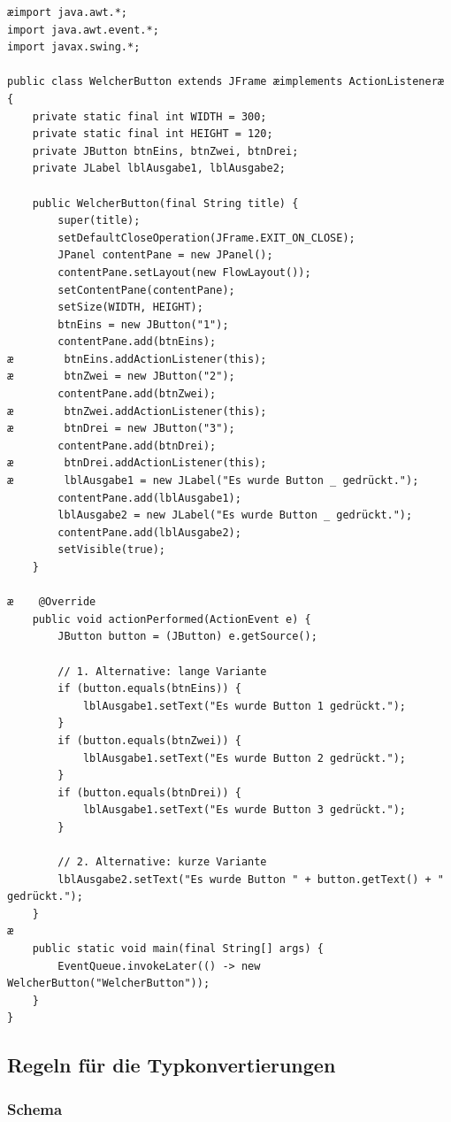 \begin{lstlisting}
æimport java.awt.*;
import java.awt.event.*;
import javax.swing.*;

public class WelcherButton extends JFrame æimplements ActionListeneræ {
    private static final int WIDTH = 300;
    private static final int HEIGHT = 120;
    private JButton btnEins, btnZwei, btnDrei;
    private JLabel lblAusgabe1, lblAusgabe2;

    public WelcherButton(final String title) {
        super(title);
        setDefaultCloseOperation(JFrame.EXIT_ON_CLOSE);
        JPanel contentPane = new JPanel();
        contentPane.setLayout(new FlowLayout());
        setContentPane(contentPane);
        setSize(WIDTH, HEIGHT);
        btnEins = new JButton("1");
        contentPane.add(btnEins);
æ        btnEins.addActionListener(this);
æ        btnZwei = new JButton("2");
        contentPane.add(btnZwei);
æ        btnZwei.addActionListener(this);
æ        btnDrei = new JButton("3");
        contentPane.add(btnDrei);
æ        btnDrei.addActionListener(this);
æ        lblAusgabe1 = new JLabel("Es wurde Button _ gedrückt.");
        contentPane.add(lblAusgabe1);
        lblAusgabe2 = new JLabel("Es wurde Button _ gedrückt.");
        contentPane.add(lblAusgabe2);
        setVisible(true);
    }

æ    @Override
    public void actionPerformed(ActionEvent e) {
        JButton button = (JButton) e.getSource();

        // 1. Alternative: lange Variante
        if (button.equals(btnEins)) {
            lblAusgabe1.setText("Es wurde Button 1 gedrückt.");
        }
        if (button.equals(btnZwei)) {
            lblAusgabe1.setText("Es wurde Button 2 gedrückt.");
        }
        if (button.equals(btnDrei)) {
            lblAusgabe1.setText("Es wurde Button 3 gedrückt.");
        }

        // 2. Alternative: kurze Variante
        lblAusgabe2.setText("Es wurde Button " + button.getText() + " gedrückt.");
    }
æ
    public static void main(final String[] args) {
        EventQueue.invokeLater(() -> new WelcherButton("WelcherButton"));
    }
}
\end{lstlisting}


\subsection{Regeln für die Typkonvertierungen}

\subsubsection{Schema}

